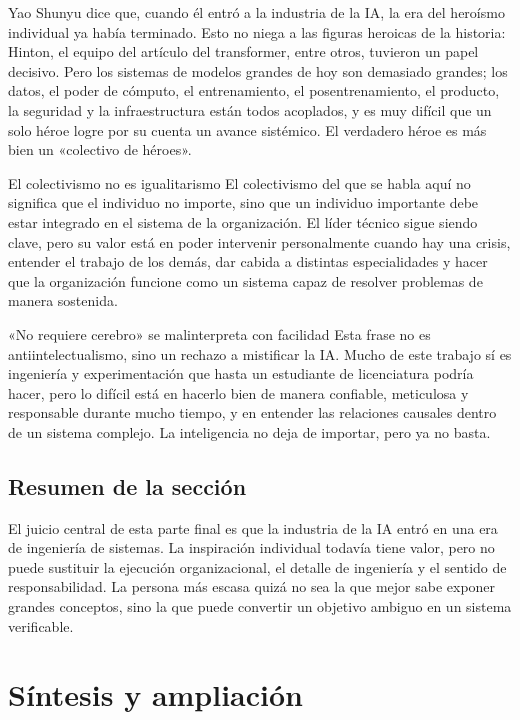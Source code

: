 \documentclass[a4paper]{article}
\begin{document}
Yao Shunyu dice que, cuando él entró a la industria de la IA, la era del heroísmo individual ya había terminado. Esto no niega a las figuras heroicas de la historia: Hinton, el equipo del artículo del transformer, entre otros, tuvieron un papel decisivo. Pero los sistemas de modelos grandes de hoy son demasiado grandes; los datos, el poder de cómputo, el entrenamiento, el posentrenamiento, el producto, la seguridad y la infraestructura están todos acoplados, y es muy difícil que un solo héroe logre por su cuenta un avance sistémico. El verdadero héroe es más bien un «colectivo de héroes».

\begin{knowledgebox}{El colectivismo no es igualitarismo}
El colectivismo del que se habla aquí no significa que el individuo no importe, sino que un individuo importante debe estar integrado en el sistema de la organización. El líder técnico sigue siendo clave, pero su valor está en poder intervenir personalmente cuando hay una crisis, entender el trabajo de los demás, dar cabida a distintas especialidades y hacer que la organización funcione como un sistema capaz de resolver problemas de manera sostenida.
\end{knowledgebox}

\begin{warningbox}{«No requiere cerebro» se malinterpreta con facilidad}
Esta frase no es antiintelectualismo, sino un rechazo a mistificar la IA. Mucho de este trabajo sí es ingeniería y experimentación que hasta un estudiante de licenciatura podría hacer, pero lo difícil está en hacerlo bien de manera confiable, meticulosa y responsable durante mucho tiempo, y en entender las relaciones causales dentro de un sistema complejo. La inteligencia no deja de importar, pero ya no basta.
\end{warningbox}

\subsection{Resumen de la sección}

El juicio central de esta parte final es que la industria de la IA entró en una era de ingeniería de sistemas. La inspiración individual todavía tiene valor, pero no puede sustituir la ejecución organizacional, el detalle de ingeniería y el sentido de responsabilidad. La persona más escasa quizá no sea la que mejor sabe exponer grandes conceptos, sino la que puede convertir un objetivo ambiguo en un sistema verificable.
\section{Síntesis y ampliación}
\end{document}
